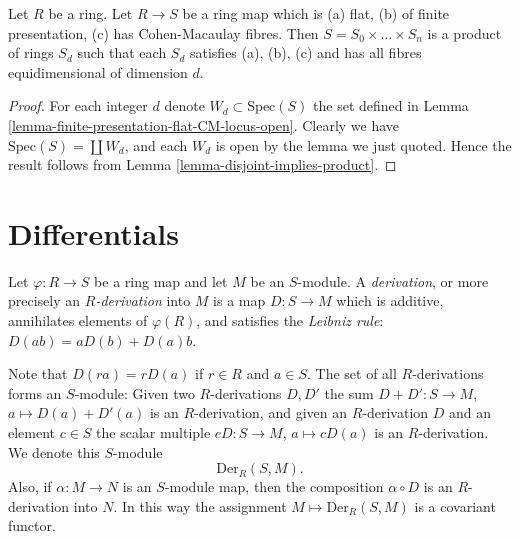 \begin{lemma}
\label{lemma-relative-dimension-CM}
Let $R$ be a ring. Let $R \to S$ be a ring map
which is (a) flat, (b) of finite presentation, (c) has
Cohen-Macaulay fibres. Then $S = S_0 \times \ldots \times S_n$
is a product of rings $S_d$ such that each $S_d$ satisfies
(a), (b), (c) and has all fibres equidimensional of dimension $d$.
\end{lemma}

\begin{proof}
For each integer $d$ denote $W_d \subset \text{Spec}(S)$ the set
defined in Lemma \ref{lemma-finite-presentation-flat-CM-locus-open}.
Clearly we have $\text{Spec}(S) = \coprod W_d$, and each $W_d$
is open by the lemma we just quoted. Hence the result follows
from Lemma \ref{lemma-disjoint-implies-product}.
\end{proof}
















\section{Differentials}
\label{section-differentials}

\begin{definition}
\label{definition-derivation}
Let $\varphi : R \to S$ be a ring map and let $M$ be an $S$-module.
A {\it derivation}, or more precisely an
{\it $R$-derivation} into $M$ is a map $D : S \to M$
which is additive, annihilates elements of $\varphi(R)$,
and satisfies the {\it Leibniz rule}:
$D(ab) = aD(b) + D(a)b$.
\end{definition}

\noindent
Note that $D(ra) = rD(a)$ if $r\in R$ and $a\in S$.
The set of all $R$-derivations forms an
$S$-module: Given two $R$-derivations $D, D'$
the sum $D + D' : S \to M$, $a \mapsto D(a)+D'(a)$
is an $R$-derivation, and given an $R$-derivation $D$
and an element $c\in S$ the scalar multiple $cD : S \to M$,
$a \mapsto cD(a)$ is an $R$-derivation. We denote this
$S$-module
$$
\text{Der}_R(S, M).
$$
Also, if $\alpha : M \to N$ is an $S$-module map, then the
composition $\alpha \circ D$ is an $R$-derivation into
$N$. In this way the assignment $M \mapsto \text{Der}_R(S, M)$
is a covariant functor.

